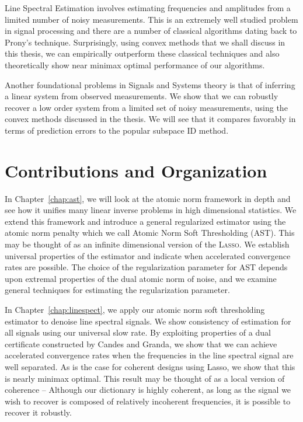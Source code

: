 Line Spectral Estimation involves estimating frequencies and amplitudes from a
limited number of noisy measurements. This is an extremely well studied problem
in signal processing and there are a number of classical algorithms dating back
to Prony's technique. Surprisingly, using convex methods that we shall discuss
in this thesis, we can empirically outperform these classical techniques and
also theoretically show near minimax optimal performance of our algorithms.

Another foundational problems in Signals and Systems theory is that of inferring
a linear system from observed measurements. We show that we can robustly recover
a low order system from a limited set of noisy measurements, using the convex
methods discussed in the thesis. We will see that it compares favorably in terms
of prediction errors to the popular subspace ID method.

\section*{Contributions and Organization} %
\label{sec:contributions}

In Chapter~\ref{chap:ast}, we will look at the atomic norm framework in depth
and see how it unifies many linear inverse problems in high dimensional
statistics. We extend this framework and introduce a general regularized
estimator using the atomic norm penalty which we call Atomic Norm Soft
Thresholding (AST). This may be thought of as an infinite dimensional version of
the \textsc{Lasso}. We establish universal properties of the estimator and
indicate when accelerated convergence rates are possible. The choice of the
regularization parameter for AST depends upon extremal properties of the dual
atomic norm of noise, and we examine general techniques for estimating the
regularization parameter.

In Chapter~\ref{chap:linespect}, we apply our atomic norm soft thresholding
estimator to denoise line spectral signals. We show consistency of estimation
for all signals using our universal slow rate. By exploiting properties of a
dual certificate constructed by Candes and Granda, we show that we can achieve
accelerated convergence rates when the frequencies in the line spectral signal
are well separated. As is the case for coherent designs using Lasso, we show
that this is nearly minimax optimal. This result may be thought of as a local
version of coherence -- Although our dictionary is highly coherent, as long as
the signal we wish to recover is composed of relatively incoherent frequencies,
it is possible to recover it robustly.

